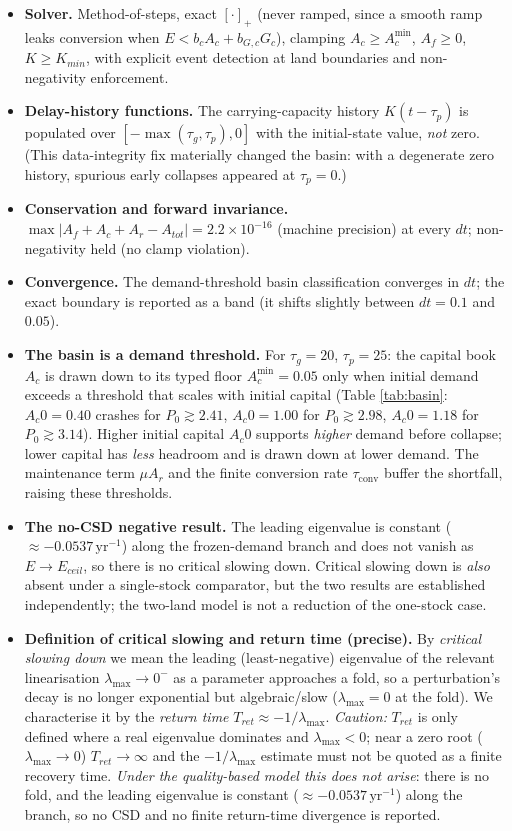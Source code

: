 \documentclass[11pt]{article}
\begin{document}
\begin{itemize}
\item \textbf{Solver.} Method-of-steps, exact $[\cdot]_+$ (never ramped, since a smooth ramp leaks conversion when $E<b_cA_c+b_{G,c}G_c$), clamping $A_c\ge A_c^{\min}$, $A_f\ge0$, $K\ge K_{min}$, with explicit event detection at land boundaries and non-negativity enforcement.
\item \textbf{Delay-history functions.} The carrying-capacity history $K(t-\tau_p)$ is populated over $[-\max(\tau_g,\tau_p),0]$ with the initial-state value, \emph{not} zero. (This data-integrity fix materially changed the basin: with a degenerate zero history, spurious early collapses appeared at $\tau_p=0$.)
\item \textbf{Conservation and forward invariance.} $\max|A_f+A_c+A_r-A_{tot}|=2.2\times10^{-16}$ (machine precision) at every $dt$; non-negativity held (no clamp violation).
\item \textbf{Convergence.} The demand-threshold basin classification converges in $dt$; the exact boundary is reported as a band (it shifts slightly between $dt=0.1$ and $0.05$).
\item \textbf{The basin is a demand threshold.} For $\tau_g=20$, $\tau_p=25$: the capital book $A_c$ is drawn down to its typed floor $A_c^{\min}=0.05$ only when initial demand exceeds a threshold that scales with initial capital (Table \ref{tab:basin}: $A_c0=0.40$ crashes for $P_0\gtrsim2.41$, $A_c0=1.00$ for $P_0\gtrsim2.98$, $A_c0=1.18$ for $P_0\gtrsim3.14$). Higher initial capital $A_c0$ supports \emph{higher} demand before collapse; lower capital has \emph{less} headroom and is drawn down at lower demand. The maintenance term $\mu A_r$ and the finite conversion rate $\tau_{\mathrm{conv}}$ buffer the shortfall, raising these thresholds.
\item \textbf{The no-CSD negative result.} The leading eigenvalue is constant ($\approx-0.0537\,\text{yr}^{-1}$) along the frozen-demand branch and does not vanish as $E\to E_{ceil}$, so there is no critical slowing down. Critical slowing down is \emph{also} absent under a single-stock comparator, but the two results are established independently; the two-land model is not a reduction of the one-stock case.
\item \textbf{Definition of critical slowing and return time (precise).} By \emph{critical slowing down} we mean the leading (least-negative) eigenvalue of the relevant linearisation $\lambda_{\max}\to0^-$ as a parameter approaches a fold, so a perturbation's decay is no longer exponential but algebraic/slow ($\lambda_{\max}=0$ at the fold). We characterise it by the \emph{return time} $T_{ret}\approx-1/\lambda_{\max}$. \emph{Caution:} $T_{ret}$ is only defined where a real eigenvalue dominates and $\lambda_{\max}<0$; near a zero root ($\lambda_{\max}\to0$) $T_{ret}\to\infty$ and the $-1/\lambda_{\max}$ estimate must not be quoted as a finite recovery time. \emph{Under the quality-based model this does not arise}: there is no fold, and the leading eigenvalue is constant ($\approx-0.0537\,\text{yr}^{-1}$) along the branch, so no CSD and no finite return-time divergence is reported.

\end{itemize}
\end{document}
